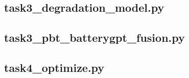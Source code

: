 \subsection{task3\_degradation\_model.py}



\subsection{task3\_pbt\_batterygpt\_fusion.py}



\subsection{task4\_optimize.py}


